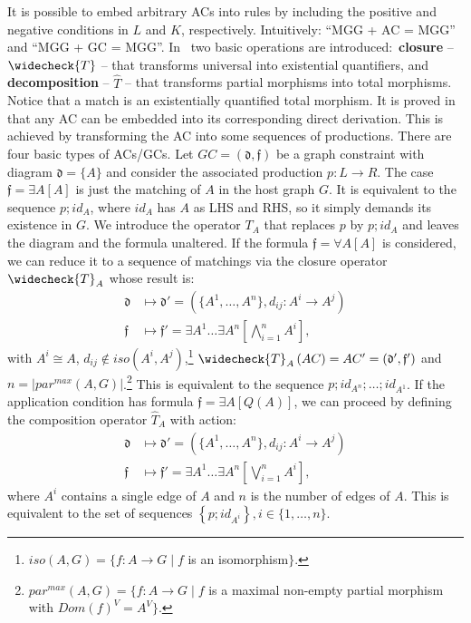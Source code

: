 \documentclass{fundam}
\newcommand{\abb}[3]{#1 \colon #2 \rightarrow #3}
\begin{document}
It is possible to embed arbitrary ACs into rules by including the
positive and negative conditions in $L$ and $K$, respectively.
Intuitively: ``MGG + AC = MGG'' and ``MGG + GC =
MGG''. In~\cite{MGGfundamenta} two basic operations are
introduced:~\textbf{closure} -- $\widecheck{T}$ -- that transforms
universal into existential quantifiers, and \textbf{decomposition} --
$\widehat{T}$ -- that transforms partial morphisms into total
morphisms. Notice that a match is an existentially quantified total
morphism. It is proved in~\cite{MGGfundamenta} that any AC can be
embedded into its corresponding direct derivation. This is achieved by
transforming the AC into some sequences of productions. There are four
basic types of ACs/GCs. Let $GC = \left( \mathfrak{d}, \mathfrak{f}
\right)$ be a graph constraint with diagram $\mathfrak{d} = \{ A \}$
and consider the associated production $p:L \to R$. The case
$\mathfrak{f} = \exists A[A]$ is just the matching of $A$ in the host
graph $G$. It is equivalent to the sequence $p ; id_A$, where $id_A$
has $A$ as LHS and RHS, so it simply demands its existence in $G$. We
introduce the operator $T_A$ that replaces $p$ by $p;id_A$ and leaves
the diagram and the formula unaltered. If the formula $\mathfrak{f} =
\forall A [A]$ is considered, we can reduce it to a sequence of
matchings via the closure operator $\widecheck{T}_A$ whose result is:
\begin{align}
  \label{eq:closure}
  \mathfrak{d} & \longmapsto \mathfrak{d}' = \left(\{ A^1, \ldots,
    A^n \}, d_{ij}:A^i \rightarrow A^j \right) \nonumber \\
  \mathfrak{f} & \longmapsto \mathfrak{f}' = \exists A^1 \ldots
  \exists A^n \left[ \bigwedge_{i=1}^n A^i \right],
\end{align} 
with $A^i \cong A$, $d_{ij} \not \in iso(A^i, A^j)$,\footnote{$iso(A,
  G) = \{ \abb{f}{A}{G} \; | \; f$ is an isomorphism$\}$.}
$\widecheck{T}_A \left( AC \right) = AC' = \left( \mathfrak{d}',
  \mathfrak{f}' \right)$ and $n=|par^{max}(A,
G)|$.\footnote{$par^{max}(A, G) = \{ \abb{f}{A}{G} \; | \; f$ is a
  maximal non-empty partial morphism with $Dom(f)^V=A^V \}$.} This is
equivalent to the sequence $p;id_{A^n};\ldots;id_{A^1}$. If the
application condition has formula $\mathfrak{f} = \exists A [Q(A)]$,
we can proceed by defining the composition operator $\widehat{T}_A$
with action:
\begin{align}
  \label{eq:decomp}
  \mathfrak{d} & \longmapsto \mathfrak{d}' = \left(\{ A^1, \ldots,
    A^n \}, d_{ij}:A^i \rightarrow A^j \right) \nonumber \\
  \mathfrak{f} & \longmapsto \mathfrak{f}' = \exists A^1 \ldots
  \exists A^n \left[ \bigvee_{i=1}^n A^i \right],
\end{align}
where $A^i$ contains a single edge of $A$ and $n$ is the number of
edges of $A$. This is equivalent to the set of sequences $\left\{
  p;id_{A^i} \right\}, i \in \{1, \ldots, n\}$.
\end{document}
